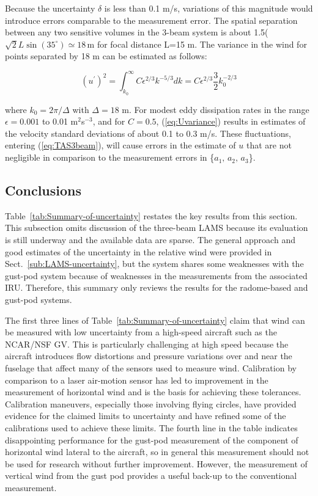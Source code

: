 \documentclass[12pt,twoside,english]{article}\usepackage[]{graphicx}\usepackage[]{color}
\let\OrgIndex\index
\renewcommand*{\index}[1]{\OrgIndex{#1}}
\begin{document}
Because the uncertainty $\delta$ is less than 0.1 m/s, variations of this magnitude would introduce errors comparable to the measurement error. The spatial separation between any two sensitive volumes in the 3-beam system is about 1.5($\sqrt{2}L\sin(35^{\circ})\simeq18$\,m for focal distance L=15 m. The variance in the wind for points separated by 18 m can be estimated as follows: 

\begin{equation}
(u^{\prime})^{2}=\int_{k_{0}}^{\infty}C\epsilon^{2/3}k^{-5/3}dk=C\epsilon^{2/3}\frac{3}{2}k_{0}^{-2/3}\label{eq:Uvariance} 
\end{equation}


where $k_{0}=2\pi/\Delta$ with $\Delta=18$ m. For modest eddy dissipation rates in the range $\epsilon=0.001$ to 0.01 m$^{2}$s$^{-3}$, and for $C=0.5$, (\ref{eq:Uvariance}) results in estimates of the velocity standard deviations of about 0.1 to 0.3 m/s. These fluctuations, entering (\ref{eq:TAS3beam}), will cause errors in the estimate of $u$ that are not negligible in comparison to the measurement errors in \{$a_{1},\,a_{2},\,a_{3}$\}. 


\subsection{Conclusions\label{sub:Conclusions}}

Table~\ref{tab:Summary-of-uncertainty} restates the key results from this section. 
This subsection omits discussion of the three-beam LAMS because its evaluation is still underway and the available data are sparse. The general approach and good estimates of
the uncertainty in the relative wind were provided in Sect.~\ref{sub:LAMS-uncertainty},
but the system shares some weaknesses with the gust-pod system because of weaknesses
in the measurements from the associated IRU. Therefore, this summary only reviews the
results for the radome-based and gust-pod systems.

The first three lines of Table~\ref{tab:Summary-of-uncertainty} claim that wind can be measured with low uncertainty from a high-speed aircraft such as the NCAR/NSF GV. This is particularly challenging at high speed because the aircraft introduces flow distortions and pressure variations over and near the fuselage that affect many of the sensors used to measure wind. Calibration by comparison to a laser air-motion sensor has led to improvement in the measurement of horizontal wind and is the basis for achieving these tolerances. Calibration maneuvers, especially those involving flying circles, have provided evidence for the claimed limits to uncertainty and have refined some of the calibrations used to achieve these limits. The fourth line in the table indicates disappointing performance for the gust-pod measurement of the component of horizontal wind lateral to the aircraft, so in general this measurement should not be used for research without further improvement. However, the measurement of vertical wind from the gust pod provides a useful back-up to the conventional measurement. 
\end{document}
